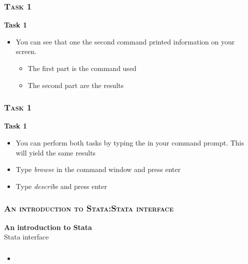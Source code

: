 \documentclass[10pt]{beamer}
\begin{document}
	\begin{frame}
		\frametitle{\textsc{Task 1}}
		\begin{center}
			\Large\textbf{Task 1}
		\end{center}
		\begin{itemize}
			\item You can see that one the second command printed information on your screen.
			\begin{itemize}
				\item The first part is the command used
				\item The second part are the results
			\end{itemize}
		\end{itemize}

	\end{frame}



	\begin{frame}
		\frametitle{\textsc{Task 1}}
		\begin{center}
			\Large\textbf{Task 1}
		\end{center}
		\begin{itemize}
			\item You can perform both tasks by typing the in your command prompt. This will yield the same results
			
			\item Type \textit{browse} in the command window and press enter
			
			\item Type \textit{describe} and press enter
			
		\end{itemize}
	\end{frame}




	\begin{frame}
		\frametitle{\textsc{An introduction to Stata:Stata interface}}
		\begin{center}
			\textbf{An introduction to Stata} \\
			Stata interface
		\end{center}
	\end{frame}

	\begin{frame}
\frametitle{\textsc{}}
\begin{center}
	\Large\textbf{}
\end{center}
\begin{itemize}
	\item
\end{itemize}
\end{frame}
\end{document}
